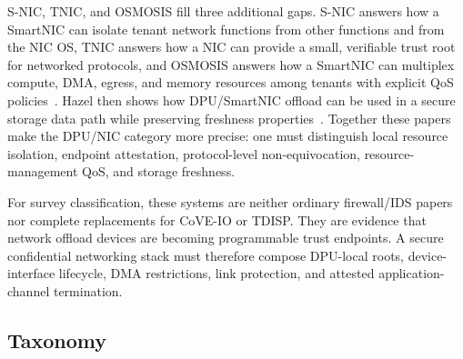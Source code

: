 S-NIC, TNIC, and OSMOSIS fill three additional gaps. S-NIC answers how a
SmartNIC can isolate tenant network functions from other functions and from the
NIC OS, TNIC answers how a NIC can provide a small, verifiable trust root for
networked protocols, and OSMOSIS answers how a SmartNIC can multiplex
compute, DMA, egress, and memory resources among tenants with explicit QoS
policies~\cite{zhou2024snic,giantsidi2025tnic,khalilov2024osmosis}. Hazel then shows how DPU/SmartNIC
offload can be used in a secure storage data path while preserving freshness
properties~\cite{chrapek2026hazel}. Together these papers make the DPU/NIC
category more precise: one must distinguish local resource isolation, endpoint
attestation, protocol-level non-equivocation, resource-management QoS, and
storage freshness.

For survey classification, these systems are neither ordinary firewall/IDS
papers nor complete replacements for CoVE-IO or TDISP. They are evidence that
network offload devices are becoming programmable trust endpoints. A secure
confidential networking stack must therefore compose DPU-local roots,
device-interface lifecycle, DMA restrictions, link protection, and attested
application-channel termination.

\subsection{Taxonomy}

